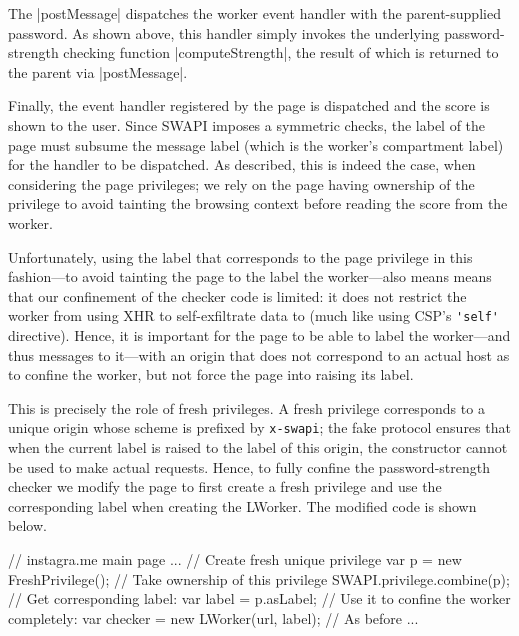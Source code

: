 The \js|postMessage| dispatches the worker event handler with the
parent-supplied password. 
%
As shown above, this handler simply invokes the underlying
password-strength checking function \js|computeStrength|, the result
of which is returned to the parent via \js|postMessage|.
%

Finally, the event handler registered by the page is dispatched and
the score is shown to the user.
%
Since SWAPI imposes a symmetric checks, the label of the page must
subsume the message label (which is the worker's compartment label)
for the handler to be dispatched.
%
As described, this is indeed the case, when considering the page
privileges;
%
we rely on the page having ownership of the 
privilege to avoid tainting the browsing context before reading the
score from the worker.

%
Unfortunately, using the label that corresponds to the page privilege
in this fashion---to avoid tainting the page to the label the
worker---also means means that our confinement of the checker code is
limited: it does not restrict the worker from using XHR to
self-exfiltrate data to  (much like using CSP's
\verb|'self'| directive).
%
Hence, it is important for the page to be able to label the
worker---and thus messages to it---with an origin that does not
correspond to an actual host as to confine the worker, but not force
the page into raising its label.

This is precisely the role of fresh privileges.
%
A fresh privilege corresponds to a unique origin whose scheme is
prefixed by \texttt{x-swapi}; the fake protocol ensures that when the
current label is raised to the label of this origin, the \xhr{}
constructor cannot be used to make actual requests.
%
Hence, to fully confine the password-strength checker we modify the
 page to first create a fresh privilege and use the
corresponding label when creating the LWorker.
%
The modified code is shown below.
\begin{jscode}
// instagra.me main page ...
// Create fresh unique privilege
var p = new FreshPrivilege();
// Take ownership of this privilege
SWAPI.privilege.combine(p);
// Get corresponding label:
var label = p.asLabel;
// Use it to confine the worker completely:
var checker = new LWorker(url, label);
// As before ...
\end{jscode}

